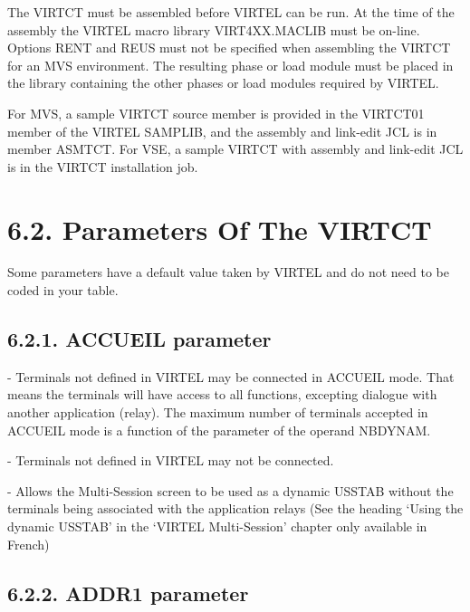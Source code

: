 \documentclass[letterpaper,10pt,english]{sphinxmanual}
\begin{document}
The VIRTCT must be assembled before VIRTEL can be run. At the time of the assembly the VIRTEL macro library VIRT4XX.MACLIB must be on-line. Options RENT and REUS must not be specified when assembling the VIRTCT for an MVS environment. The resulting phase or load module must be placed in the library containing the other phases or load modules required by VIRTEL.

For MVS, a sample VIRTCT source member is provided in the VIRTCT01 member of the VIRTEL SAMPLIB, and the assembly and link-edit JCL is in member ASMTCT. For VSE, a sample VIRTCT with assembly and link-edit JCL is in the VIRTCT installation job.


\section{6.2. Parameters Of The VIRTCT}
\label{\detokenize{Installation_Guide:parameters-of-the-virtct}}
Some parameters have a default value taken by VIRTEL and do not need to be coded in your table.


\subsection{6.2.1. ACCUEIL parameter}
\label{\detokenize{Installation_Guide:accueil-parameter}}
\begin{sphinxVerbatim}[commandchars=\\\{\}]
\PYG{p}{[}\PYG{p}{]} 
\end{sphinxVerbatim}

 - Terminals not defined in VIRTEL may be connected in ACCUEIL mode. That means the terminals will have access to all functions, excepting dialogue with another application (relay). The maximum number of terminals accepted in ACCUEIL mode is a function of the parameter of the operand NBDYNAM.

 - Terminals not defined in VIRTEL may not be connected.

 - Allows the Multi-Session screen to be used as a dynamic USSTAB without the terminals being associated with the application relays (See the heading ‘Using the dynamic USSTAB’ in the ‘VIRTEL Multi-Session’ chapter only available in French)


\subsection{6.2.2. ADDR1 parameter}
\label{\detokenize{Installation_Guide:addr1-parameter}}
\begin{sphinxVerbatim}[commandchars=\\\{\}]
 
\end{sphinxVerbatim}
\end{document}
